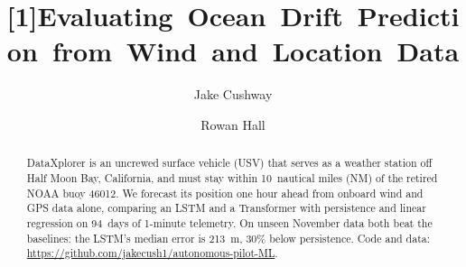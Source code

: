 \documentclass[sigconf]{acmart}
\begin{document}
\title{\mbox{\scalebox{0.985}[1]{Evaluating Ocean Drift Prediction from Wind and Location Data}}}
\author{Jake Cushway}

\author{Rowan Hall}


\begin{abstract}
DataXplorer is an uncrewed surface vehicle (USV) that serves as a weather station off Half Moon Bay, California, and must stay within 10~nautical miles (NM) of the retired NOAA buoy 46012. We forecast its position one hour ahead from onboard wind and GPS data alone, comparing an LSTM and a Transformer with persistence and linear regression on 94~days of 1-minute telemetry. On unseen November data both beat the baselines: the LSTM's median error is 213~m, 30\% below persistence. Code and data: \mbox{\url{https://github.com/jakecush1/autonomous-pilot-ML}}.
\end{abstract}

\maketitle
\pagestyle{empty}
\end{document}
